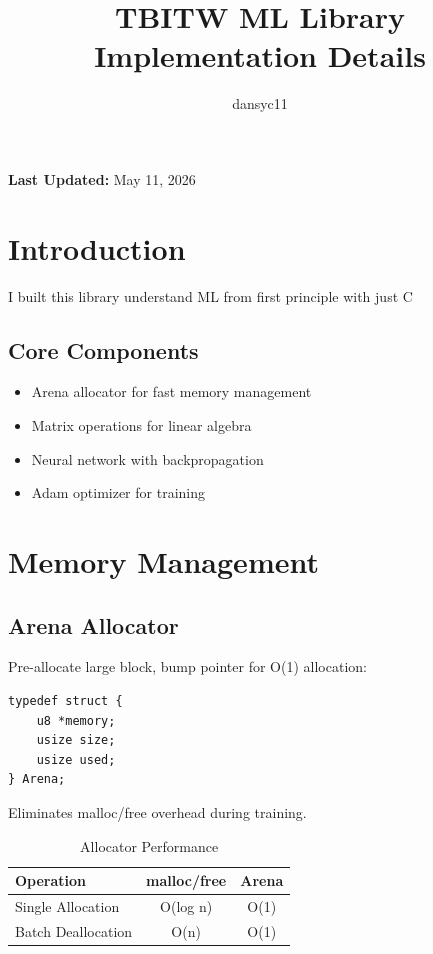 \documentclass[11pt,a4paper]{article}
\title{\textbf{TBITW ML Library}\\Implementation Details}
\author{dansyc11}
\date{}
\begin{document}
\maketitle

\noindent
\textbf{Last Updated:} May 11, 2026

\vspace{0.5cm}

\section{Introduction}

I built this library understand ML from first principle with just C

\subsection{Core Components}
\begin{itemize}
    \item Arena allocator for fast memory management
    \item Matrix operations for linear algebra
    \item Neural network with backpropagation
    \item Adam optimizer for training
\end{itemize}

\section{Memory Management}

\subsection{Arena Allocator}

Pre-allocate large block, bump pointer for O(1) allocation:

\begin{lstlisting}[caption={Arena Structure}]
typedef struct {
    u8 *memory;
    usize size;
    usize used;
} Arena;
\end{lstlisting}

Eliminates malloc/free overhead during training.

\begin{table}[h]
\centering
\begin{tabular}{lcc}
\toprule
Operation & malloc/free & Arena \\
\midrule
Single Allocation & O(log n) & O(1) \\
Batch Deallocation & O(n) & O(1) \\
\bottomrule
\end{tabular}
\caption{Allocator Performance}
\end{table}
\end{document}
